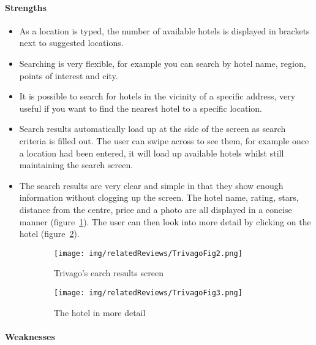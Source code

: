 
\paragraph{Strengths}
\begin{itemize}
	\item As a location is typed, the number of available hotels is displayed
		in brackets next to suggested locations.
	\item Searching is very flexible, for example you can search by hotel name,
		region, points of interest and city.
	\item It is possible to search for hotels in the vicinity of a specific
		address, very useful if you want to find the nearest hotel to a
		specific location.
	\item Search results automatically load up at the side of the screen as
		search criteria is filled out. The user can swipe across to see them,
		for example once a location had been entered, it will load up available
		hotels whilst still maintaining the search screen.
	\item The search results are very clear and simple in that they show enough
		information without clogging up the screen. The hotel name, rating,
		stars, distance from the centre, price and a photo are all displayed in
		a concise manner (figure~\ref{fig:TrivagoFig2}). The user can then look
		into more detail by clicking on the hotel
		(figure~\ref{fig:TrivagoFig3}).
\end{itemize}
\begin{figure}[ht]
	\centering
	\begin{subfigure}[b]{0.2\textwidth}
		\texttt{[image: img/relatedReviews/TrivagoFig2.png]}
		\caption{Trivago's earch results screen}\label{fig:TrivagoFig2}
	\end{subfigure}%
	\qquad
	\begin{subfigure}[b]{0.2\textwidth}
		\texttt{[image: img/relatedReviews/TrivagoFig3.png]}
		\caption{The hotel in more detail}\label{fig:TrivagoFig3}
	\end{subfigure}
	\caption{}\label{fig:trivago2}
\end{figure}

\paragraph{Weaknesses}

